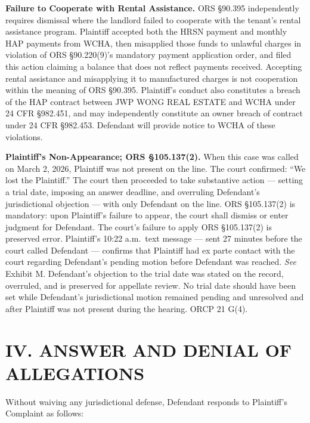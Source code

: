 \documentclass[12pt,letterpaper]{article}
\begin{document}
	\textbf{Failure to Cooperate with Rental Assistance.} ORS \S90.395 independently requires dismissal where the landlord failed to cooperate with the tenant's rental assistance program. Plaintiff accepted both the HRSN payment and monthly HAP payments from WCHA, then misapplied those funds to unlawful charges in violation of ORS \S90.220(9)'s mandatory payment application order, and filed this action claiming a balance that does not reflect payments received. Accepting rental assistance and misapplying it to manufactured charges is not cooperation within the meaning of ORS \S90.395. Plaintiff's conduct also constitutes a breach of the HAP contract between JWP WONG REAL ESTATE and WCHA under 24 CFR \S982.451, and may independently constitute an owner breach of contract under 24 CFR \S982.453. Defendant will provide notice to WCHA of these violations.
	
	\textbf{Plaintiff's Non-Appearance; ORS \S105.137(2).} When this case was called on March 2, 2026, Plaintiff was not present on the line. The court confirmed: ``We lost the Plaintiff.'' The court then proceeded to take substantive action --- setting a trial date, imposing an answer deadline, and overruling Defendant's jurisdictional objection --- with only Defendant on the line. ORS \S105.137(2) is mandatory: upon Plaintiff's failure to appear, the court shall dismiss or enter judgment for Defendant. The court's failure to apply ORS \S105.137(2) is preserved error. Plaintiff's 10:22 a.m.\ text message --- sent 27 minutes before the court called Defendant --- confirms that Plaintiff had ex parte contact with the court regarding Defendant's pending motion before Defendant was reached. \textit{See} Exhibit M. Defendant's objection to the trial date was stated on the record, overruled, and is preserved for appellate review. No trial date should have been set while Defendant's jurisdictional motion remained pending and unresolved and after Plaintiff was not present during the hearing. ORCP 21 G(4).
	
	\section*{IV. ANSWER AND DENIAL OF ALLEGATIONS}
	
	Without waiving any jurisdictional defense, Defendant responds to Plaintiff's Complaint as follows:
	
\end{document}

